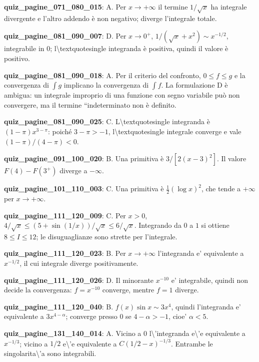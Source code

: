 \documentclass[11pt,a4paper]{article}
\newcounter{quiz}
\begin{document}
\noindent\textbf{quiz\_pagine\_071\_080\_015}: A. Per $x\to+\infty$ il termine $1/\sqrt{x}$ ha integrale divergente e l'altro addendo è non negativo; diverge l'integrale totale.\par\medskip
\noindent\textbf{quiz\_pagine\_081\_090\_007}: D. Per $x\to0^+$, $1/(\sqrt{x}+x^2)\sim x^{-1/2}$, integrabile in $0$; l\textbackslash{}textquotesingle integranda è positiva, quindi il valore è positivo.\par\medskip
\noindent\textbf{quiz\_pagine\_081\_090\_018}: A. Per il criterio del confronto, $0\leq f\leq g$ e la convergenza di $\int g$ implicano la convergenza di $\int f$. La formulazione D è ambigua: un integrale improprio di una funzione con segno variabile può non convergere, ma il termine ``indeterminato non è definito.\par\medskip
\noindent\textbf{quiz\_pagine\_081\_090\_025}: C. L\textbackslash{}textquotesingle integranda è $(1-\pi)x^{3-\pi}$: poiché $3-\pi>-1$, l\textbackslash{}textquotesingle integrale converge e vale $(1-\pi)/(4-\pi)<0$.\par\medskip
\noindent\textbf{quiz\_pagine\_091\_100\_020}: B. Una primitiva è $3/[2(x-3)^2]$. Il valore $F(4)-F(3^+)$ diverge a $-\infty$.\par\medskip
\noindent\textbf{quiz\_pagine\_101\_110\_003}: C. Una primitiva è $\frac12(\log x)^2$, che tende a $+\infty$ per $x\to+\infty$.\par\medskip
\noindent\textbf{quiz\_pagine\_111\_120\_009}: C. Per $x>0$, $4/\sqrt x\leq(5+\sin(1/x))/\sqrt x\leq6/\sqrt x$. Integrando da $0$ a $1$ si ottiene $8\leq I\leq12$; le disuguaglianze sono strette per l'integrale.\par\medskip
\noindent\textbf{quiz\_pagine\_111\_120\_023}: B. Per $x\to+\infty$ l'integranda e' equivalente a $x^{-1/2}$, il cui integrale diverge positivamente.\par\medskip
\noindent\textbf{quiz\_pagine\_111\_120\_026}: D. Il minorante $x^{-10}$ e' integrabile, quindi non decide la convergenza: $f=x^{-10}$ converge, mentre $f=1$ diverge.\par\medskip
\noindent\textbf{quiz\_pagine\_111\_120\_040}: B. $f(x)\sin x\sim3x^4$, quindi l'integranda e' equivalente a $3x^{4-\alpha}$; converge presso $0$ se $4-\alpha>-1$, cioe' $\alpha<5$.\par\medskip
\noindent\textbf{quiz\_pagine\_131\_140\_014}: A. Vicino a $0$ l\textbackslash{}'integranda e\textbackslash{}'e equivalente a $x^{-1/3}$; vicino a $1/2$ e\textbackslash{}'e equivalente a $C(1/2-x)^{-1/3}$. Entrambe le singolarita\textbackslash{}'a sono integrabili.\par\medskip
\end{document}
